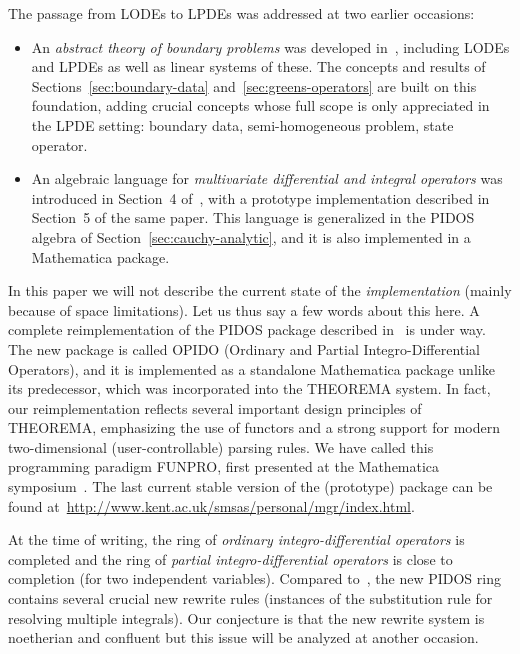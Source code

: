 \documentclass[a4paper]{llncs}
\begin{document}
\noindent The passage from LODEs to LPDEs was addressed at two earlier occasions:
\begin{itemize}
\item An \emph{abstract theory of boundary problems} was developed
  in~\cite{RegensburgerRosenkranz2009}, including LODEs and LPDEs as well as
  linear systems of these. The concepts and results of
  Sections~\ref{sec:boundary-data} and~\ref{sec:greens-operators} are built on
  this foundation, adding crucial concepts whose full scope is only appreciated
  in the LPDE setting: boundary data, semi-homogeneous problem, state operator.
\item An algebraic language for \emph{multivariate differential and integral
    operators} was introduced in Section~4
  of~\cite{RosenkranzRegensburgerTecBuchberger2009}, with a prototype
  implementation described in Section~5 of the same paper. This language is
  generalized in the PIDOS algebra of Section~\ref{sec:cauchy-analytic}, and it
  is also implemented in a Mathematica package.
\end{itemize}

In this paper we will not describe the current state of the
\emph{implementation} (mainly because of space limitations). Let us thus say a
few words about this here. A complete reimplementation of the PIDOS package
described in~\cite{RosenkranzRegensburgerTecBuchberger2009} is under way. The
new package is called OPIDO (Ordinary and Partial Integro-Differential
Operators), and it is implemented as a standalone Mathematica package unlike its
predecessor, which was incorporated into the THEOREMA system. In fact, our
reimplementation reflects several important design principles of THEOREMA,
emphasizing the use of functors and a strong support for modern two-dimensional
(user-controllable) parsing rules. We have called this programming paradigm
FUNPRO, first presented at the Mathematica symposium~\cite{Rosenkranz2012}. The
last current stable version of the (prototype) package can be found
at~\url{http://www.kent.ac.uk/smsas/personal/mgr/index.html}.

At the time of writing, the ring of \emph{ordinary integro-differential
  operators} is completed and the ring of \emph{partial integro-differential
  operators} is close to completion (for two independent variables). Compared
to~\cite{RosenkranzRegensburgerTecBuchberger2009}, the new PIDOS ring contains
several crucial new rewrite rules (instances of the substitution rule for
resolving multiple integrals). Our conjecture is that the new rewrite system is
noetherian and confluent but this issue will be analyzed at another occasion.
\end{document}
